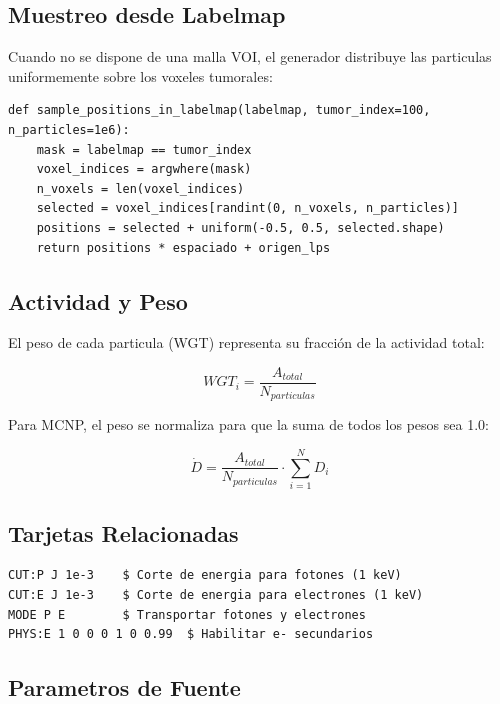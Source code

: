 \documentclass[12pt,a4paper]{article}
\begin{document}
\subsection{Muestreo desde Labelmap}

Cuando no se dispone de una malla VOI, el generador distribuye las particulas uniformemente sobre los voxeles tumorales:

\begin{lstlisting}
def sample_positions_in_labelmap(labelmap, tumor_index=100, n_particles=1e6):
    mask = labelmap == tumor_index
    voxel_indices = argwhere(mask)
    n_voxels = len(voxel_indices)
    selected = voxel_indices[randint(0, n_voxels, n_particles)]
    positions = selected + uniform(-0.5, 0.5, selected.shape)
    return positions * espaciado + origen_lps
\end{lstlisting}

\subsection{Actividad y Peso}

El peso de cada particula (WGT) representa su fracción de la actividad total:

$$
WGT_i = \frac{A_{total}}{N_{particulas}}
$$


Para MCNP, el peso se normaliza para que la suma de todos los pesos sea 1.0:

$$
\dot{D} = \frac{A_{total}}{N_{particulas}} \cdot \sum_{i=1}^{N} D_i
$$


\subsection{Tarjetas Relacionadas}

\begin{lstlisting}
CUT:P J 1e-3    $ Corte de energia para fotones (1 keV)
CUT:E J 1e-3    $ Corte de energia para electrones (1 keV)
MODE P E        $ Transportar fotones y electrones
PHYS:E 1 0 0 0 1 0 0.99  $ Habilitar e- secundarios
\end{lstlisting}

\subsection{Parametros de Fuente}
\end{document}
